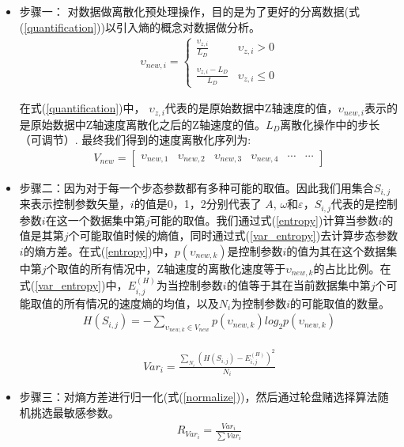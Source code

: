 \begin{itemize}
	\item 步骤一： 对数据做离散化预处理操作，目的是为了更好的分离数据(式(\ref{quantification}))以引入熵的概念对数据做分析。
	\begin{eqnarray}\label{quantification}
	\upsilon_{new,i}=\left\{
	\begin{array}{lr}
	\frac{\upsilon_{z,i}}{L_{D}} &\upsilon_{z,i}> 0\\
	\\
	\frac{\upsilon_{z,i}-L_{D}}{L_{D}} &\upsilon_{z,i}\leq 0
	\end{array}
	\right.
	\end{eqnarray}
	
	在式(\ref{quantification})中， $\upsilon_{z,i}$代表的是原始数据中Z轴速度的值，$\upsilon_{new,i}$表示的是原始数据中Z轴速度离散化之后的Z轴速度的值。$L_{D}$离散化操作中的步长（可调节）. 最终我们得到的速度离散化序列为:
	\begin{eqnarray}\label{newMember}
	V_{new}=\begin{bmatrix}
	\upsilon_{new,1} & \upsilon_{new,2} & \upsilon_{new,3} & \upsilon_{new,4} & \cdots & \cdots
	\end{bmatrix}
	\end{eqnarray}
	
	\item 步骤二：因为对于每一个步态参数都有多种可能的取值。因此我们用集合$S_{i,j}$来表示控制参数矢量，$i$的值是0，1，2分别代表了 $A$, $\omega$和$\varepsilon$，$S_{i,j}$代表的是控制参数$i$在这一个数据集中第$j$可能的取值。我们通过式(\ref{entropy})计算当参数$i$的值是其第$j$个可能取值时候的熵值，同时通过式(\ref{var_entropy})去计算步态参数$i$的熵方差。在式(\ref{entropy})中，$p(\upsilon_{new,k})$是控制参数$i$的值为其在这个数据集中第$j$个取值的所有情况中，Z轴速度的离散化速度等于$\upsilon_{new,k}$的占比比例。在式(\ref{var_entropy})中，$E^{(H)}_{i,j}$为当控制参数$i$的值等于其在当前数据集中第$j$个可能取值的所有情况的速度熵的均值，以及$N_{i}$为控制参数$i$的可能取值的数量。
	\begin{eqnarray}\label{entropy}
	H(S_{i,j})=-\sum _{\upsilon_{new,k}\in V_{new}}p(\upsilon_{new,k})log_{2}p(\upsilon_{new,k})
	\end{eqnarray}
	
	\begin{eqnarray}\label{var_entropy}
	Var_{i}=\frac{\sum _{N_{i}}(H(S_{i,j})-E^{(H)}_{i,j})^{2}}{N_{i}}
	\end{eqnarray}
	
	\item 步骤三：对熵方差进行归一化(式(\ref{normalize}))，然后通过轮盘赌选择算法随机挑选最敏感参数。
	\begin{eqnarray}\label{normalize}
	R_{Var_{i}}=\frac{Var_{i}}{\sum Var_{i}}
	\end{eqnarray}
	
\end{itemize}

